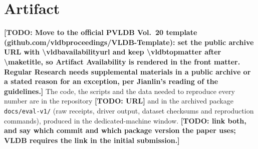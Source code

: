 \documentclass[sigconf, nonacm]{acmart}
\newcommand{\todo}[1]{\textbf{[TODO: #1]}}
\begin{document}
\section*{Artifact}
\todo{Move to the official PVLDB Vol.~20 template (github.com/vldbproceedings/VLDB-Template): set the public archive URL with \textbackslash vldbavailabilityurl and keep \textbackslash vldbtopmatter after \textbackslash maketitle, so Artifact Availability is rendered in the front matter. Regular Research needs supplemental materials in a public archive or a stated reason for an exception, per Jianlin's reading of the guidelines.}
The code, the scripts and the data needed to reproduce every number are in the repository \todo{URL} and in the archived package \texttt{docs/eval-v1/} (raw receipts, driver output, dataset checksums and reproduction commands), produced in the dedicated-machine window. \todo{link both, and say which commit and which package version the paper uses; VLDB requires the link in the initial submission.}
\end{document}

